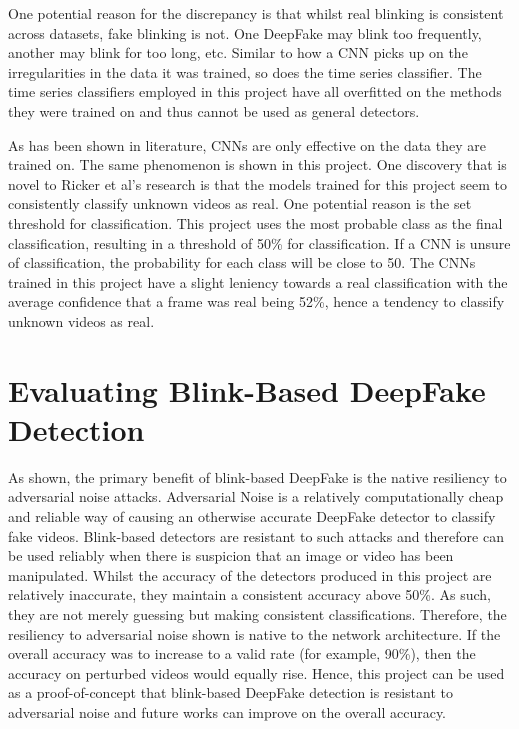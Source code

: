 One potential reason for the discrepancy is that whilst real blinking is consistent across datasets, fake blinking is not. One DeepFake may blink too frequently, another may blink for too long, etc. Similar to how a CNN picks up on the irregularities in the data it was trained, so does the time series classifier. The time series classifiers employed in this project have all overfitted on the methods they were trained on and thus cannot be used as general detectors.

As has been shown in literature\cite{ricker2022towards}, CNNs are only effective on the data they are trained on. The same phenomenon is shown in this project. One discovery that is novel to Ricker et al's research is that the models trained for this project seem to consistently classify unknown videos as real. One potential reason is the set threshold for classification. This project uses the most probable class as the final classification, resulting in a threshold of 50\% for classification. If a CNN is unsure of classification, the probability for each class will be close to 50. The CNNs trained in this project have a slight leniency towards a real classification with the average confidence that a frame was real being 52\%, hence a tendency to classify unknown videos as real.

\section{Evaluating Blink-Based DeepFake Detection}


As shown, the primary benefit of blink-based DeepFake is the native resiliency to adversarial noise attacks. Adversarial Noise is a relatively computationally cheap and reliable way of causing an otherwise accurate DeepFake detector to classify fake videos. Blink-based detectors are resistant to such attacks and therefore can be used reliably when there is suspicion that an image or video has been manipulated. Whilst the accuracy of the detectors produced in this project are relatively inaccurate, they maintain a consistent accuracy above 50\%. As such, they are not merely guessing but making consistent classifications. Therefore, the resiliency to adversarial noise shown is native to the network architecture. If the overall accuracy was to increase to a valid rate (for example, 90\%), then the accuracy on perturbed videos would equally rise. Hence, this project can be used as a proof-of-concept that blink-based DeepFake detection is resistant to adversarial noise and future works can improve on the overall accuracy.

